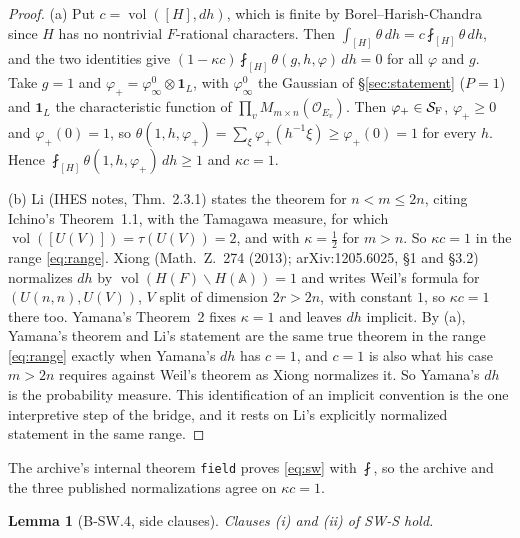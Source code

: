\documentclass[11pt]{article}
\newcommand{\lean}[1]{\nolinkurl{#1}}
\newtheorem{lemma}{Lemma}
\theoremstyle{definition}
\begin{document}
\begin{proof}
(a) Put $c=\operatorname{vol}([H],dh)$, which is finite by Borel--Harish-Chandra since $H$ has no nontrivial $F$-rational characters. Then $\int_{[H]}\theta\,dh=c\fint_{[H]}\theta\,dh$, and the two identities give $(1-\kappa c)\fint_{[H]}\theta(g,h,\varphi)\,dh=0$ for all $\varphi$ and $g$. Take $g=1$ and $\varphi_+=\varphi_\infty^0\otimes\mathbf 1_{L}$, with $\varphi_\infty^0$ the Gaussian of §\ref{sec:statement} ($P=1$) and $\mathbf 1_L$ the characteristic function of $\prod_vM_{m\times n}(\mathcal O_{E_v})$. Then $\varphi_+\in\mathcal S_{\rm F}$, $\varphi_+\ge0$ and $\varphi_+(0)=1$, so $\theta(1,h,\varphi_+)=\sum_\xi\varphi_+(h^{-1}\xi)\ge\varphi_+(0)=1$ for every $h$. Hence $\fint_{[H]}\theta(1,h,\varphi_+)\,dh\ge1$ and $\kappa c=1$.

(b) Li (IHES notes, Thm.~2.3.1) states the theorem for $n<m\le2n$, citing Ichino's Theorem~1.1, with the Tamagawa measure, for which $\operatorname{vol}([U(V)])=\tau(U(V))=2$, and with $\kappa=\frac12$ for $m>n$. So $\kappa c=1$ in the range \eqref{eq:range}. Xiong (Math.\ Z.\ 274 (2013); arXiv:1205.6025, §1 and §3.2) normalizes $dh$ by $\operatorname{vol}(H(F)\backslash H(\mathbb A))=1$ and writes Weil's formula for $(U(n,n),U(V))$, $V$ split of dimension $2r>2n$, with constant $1$, so $\kappa c=1$ there too. Yamana's Theorem~2 fixes $\kappa=1$ and leaves $dh$ implicit. By (a), Yamana's theorem and Li's statement are the same true theorem in the range \eqref{eq:range} exactly when Yamana's $dh$ has $c=1$, and $c=1$ is also what his case $m>2n$ requires against Weil's theorem as Xiong normalizes it. So Yamana's $dh$ is the probability measure. This identification of an implicit convention is the one interpretive step of the bridge, and it rests on Li's explicitly normalized statement in the same range.
\end{proof}

The archive's internal theorem \lean{field} proves \eqref{eq:sw} with $\fint$, so the archive and the three published normalizations agree on $\kappa c=1$.

\begin{lemma}[B-SW.4, side clauses]\label{lem:side}
Clauses (i) and (ii) of SW-S hold.
\end{lemma}
\end{document}
